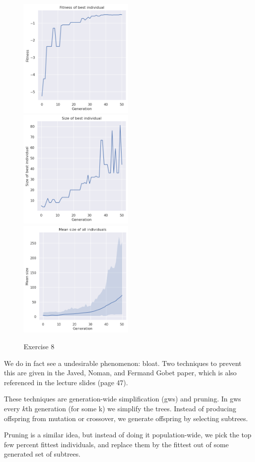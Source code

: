 \documentclass{scrartcl}
\begin{document}
\begin{figure}[ht!]
  \includegraphics[width=0.5\textwidth]{8/score_best}
  \includegraphics[width=0.5\textwidth]{8/size_best}
  \includegraphics[width=0.5\textwidth]{8/mean_size}
  \caption{Exercise 8}
  \label{fig8}
\end{figure}

We do in fact see a undesirable phenomenon: bloat. Two techniques to
prevent this are given in the Javed, Noman, and Fermand Gobet paper, which
is also referenced in the lecture slides (page 47).

These techniques are generation-wide simplification (gws) and pruning. In
gws every $k$th generation (for some k) we simplify the trees. Instead of
producing offspring from mutation or crossover, we generate offspring by
selecting subtrees.

Pruning is a similar idea, but instead of doing it population-wide, we pick
the top few percent fittest individuals, and replace them by the fittest
out of some generated set of subtrees.
\end{document}
